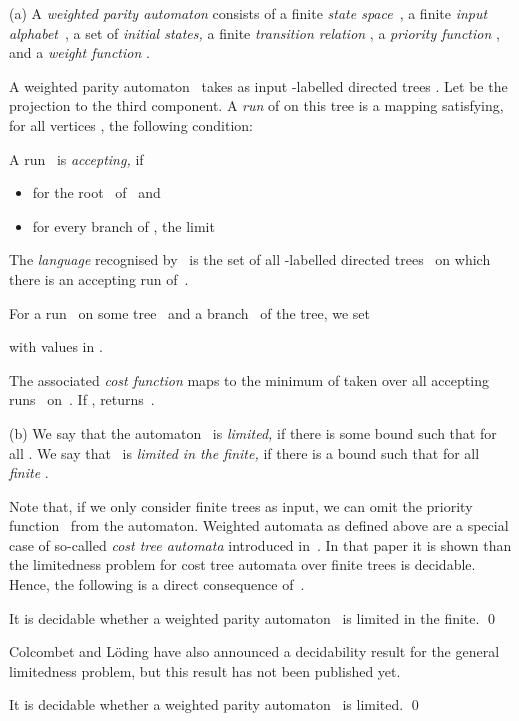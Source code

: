 \documentclass{LMCS}
\begin{document}
\begin{defi}
\textup{(a)}
A \emph{weighted parity automaton}  consists
of a finite \emph{state space}~, a finite \emph{input alphabet}~,
a set  of \emph{initial states,}
a finite \emph{transition relation}
,
a \emph{priority function} ,
and a \emph{weight function} .

A weighted parity automaton~ takes as input 
-labelled directed trees .
Let  be the projection
to the third component.
A \emph{run} of  on this tree is a mapping 
satisfying, for all vertices , the following condition\?:


A run~ is \emph{accepting,} if
\begin{itemize}
\item  for the root~ of~ and
\item for every branch  of , the limit
  
\end{itemize}
The \emph{language}  recognised by~
is the set of all -labelled directed trees~
on which there is an accepting run of~.

For a run~ on some tree~
and a branch~ of the tree, we set

with values in .

The associated \emph{cost function}  maps 
 to
the minimum of  
taken over all accepting runs~ on~.
If ,  returns~.

\textup{(b)}
We say that the automaton~ is \emph{limited,}
if there is some bound 
such that  for all .
We say that ~is \emph{limited in the finite,}
if there is a bound  such that
 for all \emph{finite} .
\end{defi}
Note that, if we only consider finite trees as input, we can omit the priority
function~ from the automaton. Weighted automata as defined above
are a special case of so-called \emph{cost tree automata}
introduced in~\cite{ColcombetLoeding08}.
In that paper it is shown than the limitedness problem for cost tree automata
over finite trees is decidable.
Hence, the following is a direct
consequence of~\cite{ColcombetLoeding08}.
\begin{thm}\label{thm:finite limitedness decidable}
It is decidable whether a weighted parity automaton~ is limited in the
finite.
\qed\end{thm}
Colcombet and L\"oding have also announced a decidability result for the
general limitedness problem, but this result has not been published yet.
\begin{thm}\label{thm:limitedness decidable}
It is decidable whether a weighted parity automaton~ is limited.
\qed\end{thm}
\end{document}
